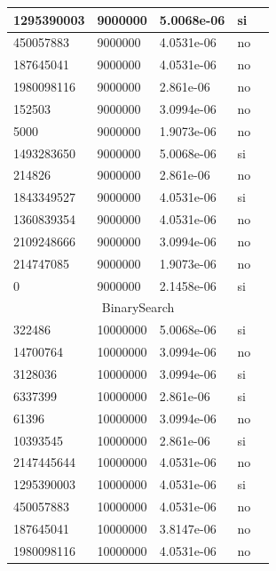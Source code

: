 \documentclass[12pt, fleqn]{article}                             %
\theoremstyle{break}                                            %
\begin{document}
\begin{longtable}{|m{5em}|m{5em}|m{10em}|m{5em}|@{}m{0pt}@{}}
            1295390003& 9000000  & 5.0068e-06 & si &\\[1em]    \hline
            450057883& 9000000  & 4.0531e-06 & no &\\[1em]    \hline
            187645041& 9000000  & 4.0531e-06 & no &\\[1em]    \hline
            1980098116& 9000000  & 2.861e-06 & no &\\[1em]    \hline
            152503& 9000000  & 3.0994e-06 & no &\\[1em]    \hline
            5000& 9000000  & 1.9073e-06 & no &\\[1em]    \hline
            1493283650& 9000000  & 5.0068e-06 & si &\\[1em]    \hline
            214826& 9000000  & 2.861e-06 & no &\\[1em]    \hline
            1843349527& 9000000  & 4.0531e-06 & si &\\[1em]    \hline
            1360839354& 9000000  & 4.0531e-06 & no &\\[1em]    \hline
            2109248666& 9000000  & 3.0994e-06 & no &\\[1em]    \hline
            214747085& 9000000  & 1.9073e-06 & no &\\[1em]    \hline
            0& 9000000  & 2.1458e-06 & si &\\[1em]    \hline
            \multicolumn{5}{|c|}{BinarySearch}   \\          \hline
            322486& 10000000  & 5.0068e-06 & si &\\[1em]    \hline
            14700764& 10000000  & 3.0994e-06 & no &\\[1em]    \hline
            3128036& 10000000  & 3.0994e-06 & si &\\[1em]    \hline
            6337399& 10000000  & 2.861e-06 & si &\\[1em]    \hline
            61396& 10000000  & 3.0994e-06 & no &\\[1em]    \hline
            10393545& 10000000  & 2.861e-06 & si &\\[1em]    \hline
            2147445644& 10000000  & 4.0531e-06 & no &\\[1em]    \hline
            1295390003& 10000000  & 4.0531e-06 & si &\\[1em]    \hline
            450057883& 10000000  & 4.0531e-06 & no &\\[1em]    \hline
            187645041& 10000000  & 3.8147e-06 & no &\\[1em]    \hline
            1980098116& 10000000  & 4.0531e-06 & no &\\[1em]    \hline

\end{longtable}
\end{document}
